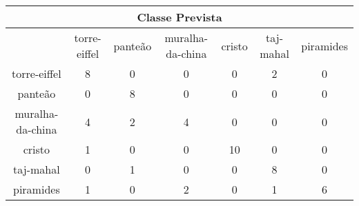 \begin{tabular}{|c|c|c|c|c|c|c|}
\hline
\multicolumn{7}{|c|}{Classe Prevista}\\
\hline
 & torre-eiffel & panteão & muralha-da-china & cristo & taj-mahal & piramides\\
torre-eiffel & 8 & 0 & 0 & 0 & 2 & 0\\
panteão & 0 & 8 & 0 & 0 & 0 & 0\\
muralha-da-china & 4 & 2 & 4 & 0 & 0 & 0\\
cristo & 1 & 0 & 0 & 10 & 0 & 0\\
taj-mahal & 0 & 1 & 0 & 0 & 8 & 0\\
piramides & 1 & 0 & 2 & 0 & 1 & 6\\
\hline
\end{tabular}
